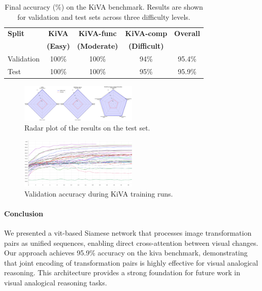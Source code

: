 \documentclass[twocolumn]{article} %
\begin{document}
\begin{table}[!htb]
    \caption{Final accuracy (\%) on the KiVA benchmark. Results are shown for validation and test sets across three difficulty levels.}
    \label{tab:kiva_results}
    \centering
    \setlength{\tabcolsep}{5pt} %
    \begin{tabular}{lcccc}
        \toprule
        \textbf{Split} & \textbf{KiVA} & \textbf{KiVA-func} & \textbf{KiVA-comp} & \textbf{Overall} \\
        & \textbf{(Easy)} & \textbf{(Moderate)} & \textbf{(Difficult)} & \\
        \midrule
        Validation & 100\% & 100\% & 94\% & 95.4\% \\
        Test & 100\% & 100\% & 95\% & 95.9\% \\
        \bottomrule
    \end{tabular}
\end{table}

\begin{figure}[h]\vspace{-\baselineskip}
    \centering
    \includegraphics[width=0.5\textwidth]{figures/combined_radar.png}
    \caption{Radar plot of the results on the test set.}
    \label{fig:radar_plot}
\end{figure}\vspace{-0.5\baselineskip}

\begin{figure}[h]\vspace{-\baselineskip}
    \centering
    \includegraphics[width=0.5\textwidth]{figures/train_runs.png}
    \caption{Validation accuracy during KiVA training runs.}
    \label{fig:train_runs}
\end{figure}\vspace{-\baselineskip}

\paragraph{Conclusion} We presented a \gls{vit}-based Siamese network that processes image transformation pairs as unified sequences, enabling direct cross-attention between visual changes. Our approach achieves 95.9\% accuracy on the \gls{kiva} benchmark, demonstrating that joint encoding of transformation pairs is highly effective for visual analogical reasoning. This architecture provides a strong foundation for future work in visual analogical reasoning tasks.


\normalsize

\end{document}
